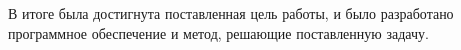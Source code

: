 
В итоге была достигнута поставленная цель работы, и было разработано программное обеспечение и метод, решающие поставленную задачу.
